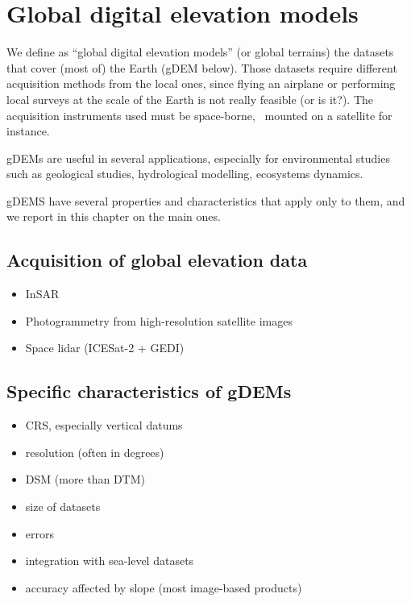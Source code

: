
\setchapterpreamble[u]{\margintoc}
\graphicspath{{gdem/figs/}}


\chapter{Global digital elevation models}%
\label{chap:gdem}

We define as ``global digital elevation models'' (or global terrains) the datasets that cover (most of) the Earth (gDEM below).%
Those datasets require different acquisition methods from the local ones, since flying an airplane or performing local surveys at the scale of the Earth is not really feasible (or is it?).
The acquisition instruments used must be space-borne, \ie\ mounted on a satellite for instance.

gDEMs are useful in several applications, especially for environmental studies such as geological studies, hydrological modelling, ecosystems dynamics.

gDEMS have several properties and characteristics that apply only to them, and we report in this chapter on the main ones.


%
\section[Acquisition of global data]{Acquisition of global elevation data}

\begin{itemize}
  \item InSAR
  \item Photogrammetry from high-resolution satellite images
  \item Space lidar (ICESat-2 + GEDI)
\end{itemize}


%
\section[Specific characteristics]{Specific characteristics of gDEMs}

\begin{itemize}
  \item CRS, especially vertical datums
  \item resolution (often in degrees)
  \item DSM (more than DTM)
  \item size of datasets
  \item errors
  \item integration with sea-level datasets
  \item accuracy affected by slope (most image-based products)
\end{itemize}


